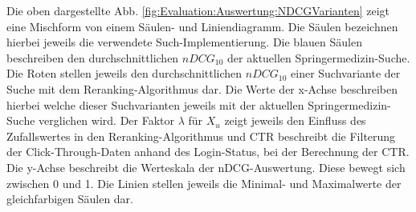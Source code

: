 \begin{figure}[H]


\vspace{-2.5em}
\end{figure}

Die oben dargestellte Abb. \ref{fig:Evaluation:Auswertung:NDCGVarianten} zeigt eine Mischform von einem Säulen- und Liniendiagramm. Die Säulen bezeichnen hierbei jeweils die verwendete Such-Implementierung. Die blauen Säulen beschreiben den durchschnittlichen $nDCG_{10}$ der aktuellen Springermedizin-Suche. Die Roten stellen jeweils den durchschnittlichen $nDCG_{10}$  einer Suchvariante der Suche mit dem Reranking-Algorithmus dar. Die Werte der x-Achse beschreiben hierbei welche dieser Suchvarianten jeweils mit der aktuellen Springermedizin-Suche verglichen wird. Der Faktor $\lambda$ für $X_u$ zeigt jeweils den Einfluss des Zufallswertes in den Reranking-Algorithmus und CTR beschreibt die Filterung der Click-Through-Daten anhand des Login-Status, bei der Berechnung der CTR. Die y-Achse beschreibt die Werteskala der nDCG-Auswertung. Diese bewegt sich zwischen 0 und 1. Die Linien stellen jeweils die Minimal- und Maximalwerte der gleichfarbigen Säulen dar.

